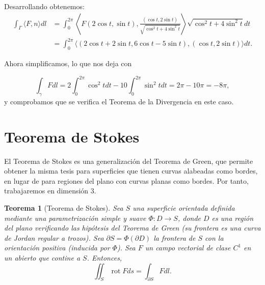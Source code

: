 \documentclass[12pt,spanish]{article}
\newtheorem{theorem}{Teorema}[section]
\theoremstyle{definition}
\theoremstyle{remark}
\begin{document}
Desarrollando obtenemos:
\begin{align*}
\int_\Gamma \langle F,n\rangle dl&=\int_0^{2\pi} \left\langle F(2\cos t, \sin t),\frac{(\cos t,2\sin t)}{\sqrt{\cos^2 t+4\sin^2 t}}\right\rangle\sqrt{\cos^2 t+4\sin^2 t} dt \\
&=\int_0^{2\pi} \langle (2\cos t+2\sin t,6\cos t-5\sin t),(\cos t,2\sin t)\rangle dt.
\end{align*}

Ahora simplificamos, lo que nos deja con

\[\int_\gamma F dl=2\int_0^{2\pi}\cos^2 t dt -10\int_0^{2\pi}\sin^2 t dt =2\pi-10\pi=-8\pi,\]
y comprobamos que se verifica el Teorema de la Divergencia en este caso.

\section{Teorema de Stokes}

El Teorema de Stokes es una generalización del Teorema de Green, que permite obtener la misma tesis para superficies que tienen curvas alabeadas como bordes, en lugar de para regiones del plano con curvas planas como bordes. Por tanto, trabajaremos en dimensión 3.

\begin{theorem}[Teorema de Stokes]
	Sea $S$ una superficie orientada definida mediante una parametrización simple y suave $\Phi:D\rightarrow S$, donde $D$ es una región del plano verificando las hipótesis del Teorema de Green (su frontera es una curva de Jordan regular a trozos). Sea $\partial S=\Phi(\partial D)$ la frontera de $S$ con la orientación positiva (inducida por $\Phi$). Sea $F$ un campo vectorial de clase $C^1$ en un abierto que contine a $S$. Entonces,
	\[\iint_S \operatorname{rot}F ds=\int_{\partial S} F dl.\]
\end{theorem}
\end{document}
